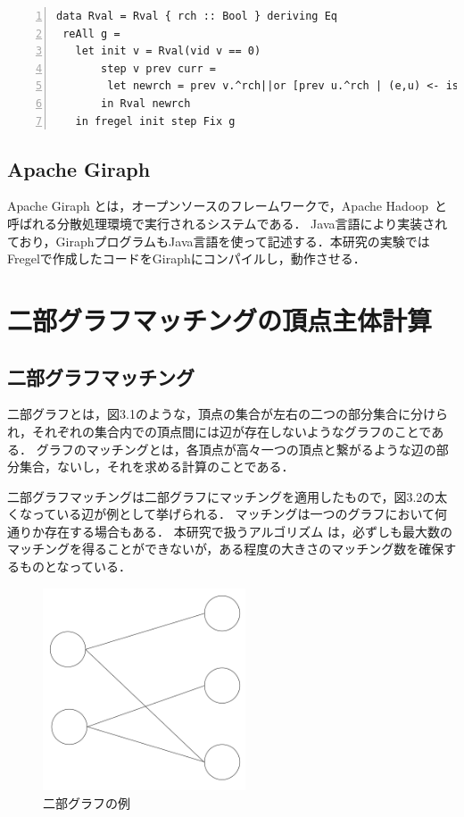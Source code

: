 \documentclass[12pt]{ujreport}
\begin{document}
\begin{lstlisting}[basicstyle=\ttfamily\footnotesize, frame = single,  numbers = left, tabsize = 3, captionpos = b, caption = {Fregelのプログラム例}]
data Rval = Rval { rch :: Bool } deriving Eq
 reAll g =
   let init v = Rval(vid v == 0)
       step v prev curr =
        let newrch = prev v.^rch||or [prev u.^rch | (e,u) <- is v]
       in Rval newrch
   in fregel init step Fix g
\end{lstlisting}

\section{Apache Giraph}
Apache Giraph \cite{giraph}とは，オープンソースのフレームワークで，Apache Hadoop~\cite{hadoop}と呼ばれる分散処理環境で実行されるシステムである．
Java言語により実装されており，GiraphプログラムもJava言語を使って記述する．本研究の実験ではFregelで作成したコードをGiraphにコンパイルし，動作させる．

\newpage

\chapter{二部グラフマッチングの頂点主体計算}
\section{二部グラフマッチング}
二部グラフとは，図3.1のような，頂点の集合が左右の二つの部分集合に分けられ，それぞれの集合内での頂点間には辺が存在しないようなグラフのことである．
グラフのマッチングとは，各頂点が高々一つの頂点と繋がるような辺の部分集合，ないし，それを求める計算のことである．

二部グラフマッチングは二部グラフにマッチングを適用したもので，図3.2の太くなっている辺が例として挙げられる．
マッチングは一つのグラフにおいて何通りか存在する場合もある．
本研究で扱うアルゴリズム \cite{pregel}は，必ずしも最大数のマッチングを得ることができないが，ある程度の大きさのマッチング数を確保するものとなっている．

\begin{figure}[ht]
  \centering
  \includegraphics[width=6cm]{二部グラフ例.pdf}
  \caption{二部グラフの例}
\end{figure}
\end{document}
